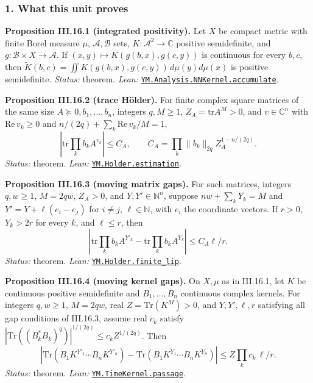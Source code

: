 \documentclass[
  letterpaper,
  11pt]{article}
\begin{document}
\subsubsection{1. What this unit proves}\label{what-this-unit-proves-18}

\textbf{Proposition III.16.1 (integrated positivity).} Let \(X\) be
compact metric with finite Borel measure \(\mu\),
\(\mathcal A,\mathcal B\) sets, \(K:\mathcal A^2\to\mathbb C\) positive
semidefinite, and \(g:\mathcal B\times X\to\mathcal A\). If
\((x,y)\mapsto K(g(b,x),g(c,y))\) is continuous for every \(b,c\), then
\(\tilde K(b,c)=\iint K(g(b,x),g(c,y))\,d\mu(y)d\mu(x)\) is positive
semidefinite. \emph{Status:} theorem. \emph{Lean:}
\href{https://github.com/yang-mills-group/OpenAI-YM-20261028/blob/3456e5e75cf8d4cd558955a5c7638fba2d68f464/YM/Analysis/Projected.lean\#L44-L70}{\texttt{YM.Analysis.NNKernel.accumulate}}.

\textbf{Proposition III.16.2 (trace Hölder).} For finite complex square
matrices of the same size \(A\succeq0,b_1,\ldots,b_n\), integers
\(q,M\ge1\), \(Z_A=\mathrm{tr}A^M>0\), and \(v\in\mathbb C^n\) with
\(\mathrm{Re}\,v_k\ge0\) and \(n/(2q)+\sum_k\mathrm{Re}\,v_k/M=1\),
\[\left|\mathrm{tr}\prod_k b_kA^{v_k}\right|\le C_A,\qquad C_A=\prod_k\|b_k\|_{2q}Z_A^{1-n/(2q)}.\]
\emph{Status:} theorem. \emph{Lean:}
\href{https://github.com/yang-mills-group/OpenAI-YM-20261028/blob/3456e5e75cf8d4cd558955a5c7638fba2d68f464/YM/Complex/Gaps.lean\#L124-L165}{\texttt{YM.Holder.estimation}}.

\textbf{Proposition III.16.3 (moving matrix gaps).} For such matrices,
integers \(q,w\ge1\), \(M=2qw\), \(Z_A>0\), and \(Y,Y'\in\mathbb N^n\),
suppose \(nw+\sum_kY_k=M\) and \(Y'=Y+\ell(e_i-e_j)\) for \(i\ne j\),
\(\ell\in\mathbb N\), with \(e_i\) the coordinate vectors. If \(r>0\),
\(Y_k>2r\) for every \(k\), and \(\ell\le r\), then
\[\left|\mathrm{tr}\prod_kb_kA^{Y'_k}-\mathrm{tr}\prod_kb_kA^{Y_k}\right|\le C_A\ell/r.\]
\emph{Status:} theorem. \emph{Lean:}
\href{https://github.com/yang-mills-group/OpenAI-YM-20261028/blob/3456e5e75cf8d4cd558955a5c7638fba2d68f464/YM/Complex/Gaps.lean\#L170-L229}{\texttt{YM.Holder.finite\_lip}}.

\textbf{Proposition III.16.4 (moving kernel gaps).} On \(X,\mu\) as in
III.16.1, let \(K\) be continuous positive semidefinite and
\(B_1,\ldots,B_n\) continuous complex kernels. For integers \(q,w\ge1\),
\(M=2qw\), real \(Z=\mathrm{Tr}(K^M)>0\), and \(Y,Y',\ell,r\) satisfying
all gap conditions of III.16.3, assume real \(c_k\) satisfy
\(|\mathrm{Tr}((B_k^*B_k)^q)|^{1/(2q)}\le c_kZ^{1/(2q)}\). Then
\[|\mathrm{Tr}(B_1K^{Y'_1}\cdots B_nK^{Y'_n})-\mathrm{Tr}(B_1K^{Y_1}\cdots B_nK^{Y_n})|\le Z\prod_kc_k\,\ell/r.\]
\emph{Status:} theorem. \emph{Lean:}
\href{https://github.com/yang-mills-group/OpenAI-YM-20261028/blob/3456e5e75cf8d4cd558955a5c7638fba2d68f464/YM/TimeKernel/Unit.lean\#L76-L106}{\texttt{YM.TimeKernel.passage}}.
\end{document}
